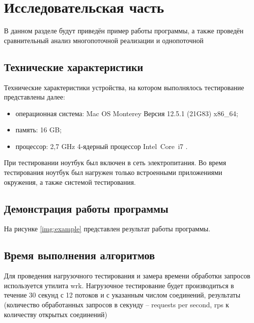 \chapter{Исследовательская часть}

В данном разделе будут приведён пример работы программы, а также проведён сравнительный анализ многопоточной реализации и однопоточной

\section{Технические характеристики}

Технические характеристики устройства, на котором выполнялось тестирование представлены далее:

\begin{itemize}
	\item операционная система: Mac OS Monterey Версия 12.5.1 (21G83) \cite{macos} x86\_64;
	\item память: 16 GB;
	\item процессор: 2,7 GHz 4‑ядерный процессор Intel Core i7 \cite{intel}.
\end{itemize}

При тестировании ноутбук был включен в сеть электропитания. Во время тестирования ноутбук был нагружен только встроенными приложениями окружения, а также системой тестирования.

\section{Демонстрация работы программы}

На рисунке \ref{img:example} представлен результат работы программы.

\clearpage

\section{Время выполнения алгоритмов}

Для проведения нагрузочного тестирования и замера времени обработки запросов используется утилита wrk.
Нагрузочное тестирование будет производиться в течение 30 секунд с 12 потоков и с указанным числом соединений, результаты (количество обработанных запросов в секунду -- requests per second, rps к количеству открытых соединений)

